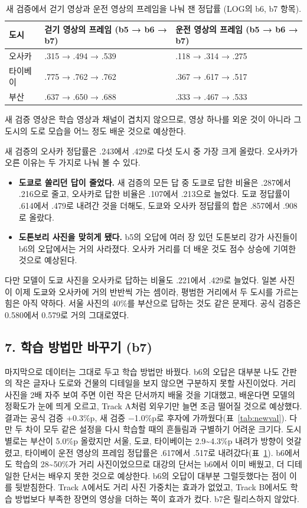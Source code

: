 \documentclass[11pt]{article}
\begin{document}
\begin{table}[H]\centering\footnotesize
\begin{tabular}{lll}
\toprule
도시 & 걷기 영상의 프레임 (b5 → b6 → b7) & 운전 영상의 프레임 (b5 → b6 → b7) \\
\midrule
오사카 & .315 → .494 → .539 & .118 → .314 → .275 \\
타이베이 & .775 → .762 → .762 & .367 → .617 → .517 \\
부산 & .637 → .650 → .688 & .333 → .467 → .533 \\
\bottomrule
\end{tabular}
\caption{새 검증에서 걷기 영상과 운전 영상의 프레임을 나눠 잰 정답률 (LOG의 b6, b7 항목).}
\label{tab:walkdrive}
\end{table}

새 검증 영상은 학습 영상과 채널이 겹치지 않으므로, 영상 하나를 외운 것이 아니라 그 도시의 도로 모습을 어느 정도 배운 것으로 예상한다.

새 검증의 오사카 정답률은 .243에서 .429로 다섯 도시 중 가장 크게 올랐다. 오사카가 오른 이유는 두 가지로 나눠 볼 수 있다.
\begin{itemize}
\item \textbf{도쿄로 쏠리던 답이 줄었다.} 새 검증의 모든 답 중 도쿄로 답한 비율은 .287에서 .216으로 줄고, 오사카로 답한 비율은 .107에서 .213으로 늘었다. 도쿄 정답률이 .614에서 .479로 내려간 것을 더해도, 도쿄와 오사카 정답률의 합은 .857에서 .908로 올랐다.
\item \textbf{도톤보리 사진을 맞히게 됐다.} b5의 오답에 여러 장 있던 도톤보리 강가 사진들이 b6의 오답에서는 거의 사라졌다. 오사카 거리를 더 배운 것도 점수 상승에 기여한 것으로 예상된다.
\end{itemize}
다만 모델이 도쿄 사진을 오사카로 답하는 비율도 .221에서 .429로 늘었다. 일본 사진이 이제 도쿄와 오사카에 거의 반반씩 가는 셈이라, 평범한 거리에서 두 도시를 가르는 힘은 아직 약하다. 서울 사진의 40\%를 부산으로 답하는 것도 같은 문제다. 공식 검증은 0.580에서 0.579로 거의 그대로였다.

\subsection*{7. 학습 방법만 바꾸기 (b7)}

마지막으로 데이터는 그대로 두고 학습 방법만 바꿨다. b6의 오답은 대부분 나도 간판의 작은 글자나 도로와 건물의 디테일을 보지 않으면 구분하지 못할 사진이었다. 거리 사진을 2배 자주 보여 주면 이런 작은 단서까지 배울 것을 기대했고, 배운다면 모델의 정확도가 눈에 띄게 오르고, Track A처럼 외우기만 늘면 조금 떨어질 것으로 예상했다. 결과는 공식 검증 +0.3\%p, 새 검증 −1.0\%p로 후자에 가까웠다(표~\ref{tab:newval}). 다만 두 차이 모두 같은 설정을 다시 학습할 때의 흔들림과 구별하기 어려운 크기다. 도시별로는 부산이 5.0\%p 올랐지만 서울, 도쿄, 타이베이는 2.9\textasciitilde 4.3\%p 내려가 방향이 엇갈렸고, 타이베이 운전 영상의 프레임 정답률은 .617에서 .517로 내려갔다(표~\ref{tab:walkdrive}). b6에서도 학습의 28\textasciitilde 50\%가 거리 사진이었으므로 대강의 단서는 b6에서 이미 배웠고, 더 디테일한 단서는 배우지 못한 것으로 예상한다. b6의 오답이 대부분 그럴듯했다는 점이 이를 뒷받침한다. Track A에서도 거리 사진 가중치는 효과가 없었고, Track B에서도 학습 방법보다 부족한 장면의 영상을 더하는 쪽이 효과가 컸다. b7은 릴리스하지 않았다.
\end{document}
